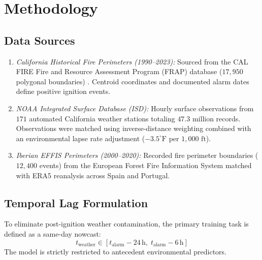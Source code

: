 \documentclass[journal]{IEEEtran}
\begin{document}
\section{Methodology}

\subsection{Data Sources}
\begin{enumerate}
    \item \emph{California Historical Fire Perimeters (1990--2023):} Sourced from the CAL FIRE Fire and Resource Assessment Program (FRAP) database ($17,950$ polygonal boundaries) \cite{calfire2024}. Centroid coordinates and documented alarm dates define positive ignition events.
    \item \emph{NOAA Integrated Surface Database (ISD):} Hourly surface observations from $171$ automated California weather stations totaling $47.3$ million records. Observations were matched using inverse-distance weighting combined with an environmental lapse rate adjustment ($-3.5^\circ\text{F}$ per $1,000\text{ ft}$).
    \item \emph{Iberian EFFIS Perimeters (2000--2020):} Recorded fire perimeter boundaries ($12,400$ events) from the European Forest Fire Information System matched with ERA5 reanalysis across Spain and Portugal.
\end{enumerate}

\subsection{Temporal Lag Formulation}
To eliminate post-ignition weather contamination, the primary training task is defined as a same-day nowcast:
\begin{equation}
    t_{\text{weather}} \in [t_{\text{alarm}} - 24\,\text{h},\; t_{\text{alarm}} - 6\,\text{h}]
\end{equation}
The model is strictly restricted to antecedent environmental predictors.
\end{document}

